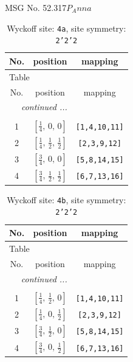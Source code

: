 \documentclass[fleqn,8pt]{jsarticle}
\begin{document}
\setcounter{MaxMatrixCols}{32}

\renewcommand{\tablename}{Table~}
\renewcommand{\figurename}{Figure~}
\begin{center}
\LARGE
MSG No. 52.317\quad$P_{A}nna$
\end{center}
\renewcommand{\arraystretch}{1.2}
\begin{longtable}{ccc}
\caption{Wyckoff site: {\tt 4a}, site symmetry: {\tt 2'2'2}}
 \\
 \hline \hline
No. & position & mapping \\ \hline \endfirsthead

\multicolumn{2}{l}{\tablename\ \thetable{}} \\
 \hline \hline
No. & position & mapping \\ \hline \endhead

 \hline \hline
\multicolumn{2}{r}{\footnotesize\it continued ...} \\ \endfoot

 \hline \hline
\multicolumn{2}{r}{} \\ \endlastfoot

1 & $\left[ \frac{1}{4},\, 0,\, 0 \right]$ & {\tt [1,4,10,11]} \\ \hline
2 & $\left[ \frac{1}{4},\, \frac{1}{2},\, \frac{1}{2} \right]$ & {\tt [2,3,9,12]} \\ \hline
3 & $\left[ \frac{3}{4},\, 0,\, 0 \right]$ & {\tt [5,8,14,15]} \\ \hline
4 & $\left[ \frac{3}{4},\, \frac{1}{2},\, \frac{1}{2} \right]$ & {\tt [6,7,13,16]} \\
\end{longtable}
\renewcommand{\arraystretch}{1.2}
\begin{longtable}{ccc}
\caption{Wyckoff site: {\tt 4b}, site symmetry: {\tt 2'2'2}}
 \\
 \hline \hline
No. & position & mapping \\ \hline \endfirsthead

\multicolumn{2}{l}{\tablename\ \thetable{}} \\
 \hline \hline
No. & position & mapping \\ \hline \endhead

 \hline \hline
\multicolumn{2}{r}{\footnotesize\it continued ...} \\ \endfoot

 \hline \hline
\multicolumn{2}{r}{} \\ \endlastfoot

1 & $\left[ \frac{1}{4},\, \frac{1}{2},\, 0 \right]$ & {\tt [1,4,10,11]} \\ \hline
2 & $\left[ \frac{1}{4},\, 0,\, \frac{1}{2} \right]$ & {\tt [2,3,9,12]} \\ \hline
3 & $\left[ \frac{3}{4},\, \frac{1}{2},\, 0 \right]$ & {\tt [5,8,14,15]} \\ \hline
4 & $\left[ \frac{3}{4},\, 0,\, \frac{1}{2} \right]$ & {\tt [6,7,13,16]} \\
\end{longtable}
\end{document}
